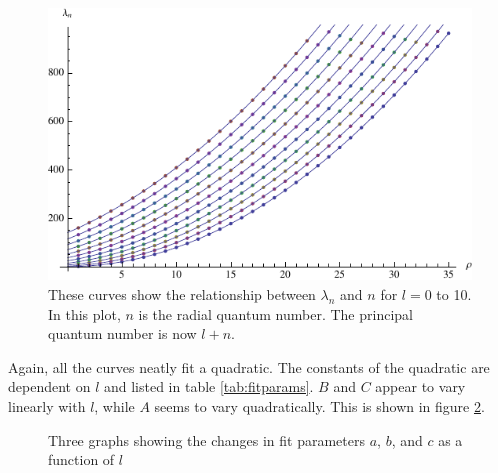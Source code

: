 \documentclass[12pt,twoside]{reedthesis}
\begin{document}
\begin{figure}[h]
\centering
\includegraphics{Figures/allthelcs}
\caption[Plots of $\lambda_n$ versus $n$ for $l = 0$ to $10$]{These curves show the relationship between $\lambda_n$ and $n$ for $l = 0$ to 10. In this plot, $n$ is the radial quantum number. The principal quantum number is now $l + n$.}
\label{fig:allthelcs}
\end{figure}

Again, all the curves neatly fit a quadratic. The constants of the quadratic are dependent on $l$ and listed in table \ref{tab:fitparams}. $B$ and $C$ appear to vary linearly with $l$, while $A$ seems to vary quadratically. This is shown in figure \ref{fig:parameters}.

\begin{figure}[h]
\centering {}
\caption[Fit parameters for $l = 0$ to 10]{Three graphs showing the changes in fit parameters $a$, $b$, and $c$ as a function of $l$}
\label{fig:parameters}
\end{figure}
\end{document}

